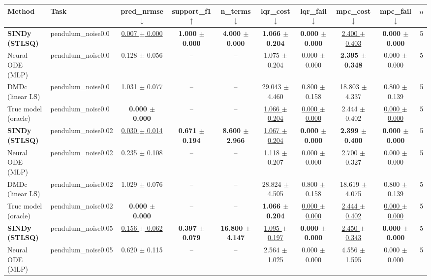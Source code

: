 \begin{tabular}{llcccccccc}
\toprule
Method & Task & pred\_nrmse $\downarrow$ & support\_f1 $\uparrow$ & n\_terms $\downarrow$ & lqr\_cost $\downarrow$ & lqr\_fail $\downarrow$ & mpc\_cost $\downarrow$ & mpc\_fail $\downarrow$ & $n$ \\
\midrule
\textbf{SINDy (STLSQ)} & pendulum\_noise0.0 & \underline{0.007 $\pm$ 0.000} & \textbf{1.000 $\pm$ 0.000} & \textbf{4.000 $\pm$ 0.000} & \textbf{1.066 $\pm$ 0.204} & \textbf{0.000 $\pm$ 0.000} & \underline{2.400 $\pm$ 0.403} & \textbf{0.000 $\pm$ 0.000} & 5 \\
Neural ODE (MLP) & pendulum\_noise0.0 & 0.128 $\pm$ 0.056 & -- & -- & 1.075 $\pm$ 0.204 & 0.000 $\pm$ 0.000 & \textbf{2.395 $\pm$ 0.348} & 0.000 $\pm$ 0.000 & 5 \\
DMDc (linear LS) & pendulum\_noise0.0 & 1.031 $\pm$ 0.077 & -- & -- & 29.043 $\pm$ 4.460 & 0.800 $\pm$ 0.158 & 18.803 $\pm$ 4.337 & 0.800 $\pm$ 0.139 & 5 \\
True model (oracle) & pendulum\_noise0.0 & \textbf{0.000 $\pm$ 0.000} & -- & -- & \underline{1.066 $\pm$ 0.204} & \underline{0.000 $\pm$ 0.000} & 2.444 $\pm$ 0.402 & \underline{0.000 $\pm$ 0.000} & 5 \\
\midrule
\textbf{SINDy (STLSQ)} & pendulum\_noise0.02 & \underline{0.030 $\pm$ 0.014} & \textbf{0.671 $\pm$ 0.194} & \textbf{8.600 $\pm$ 2.966} & \underline{1.067 $\pm$ 0.204} & \textbf{0.000 $\pm$ 0.000} & \textbf{2.399 $\pm$ 0.400} & \textbf{0.000 $\pm$ 0.000} & 5 \\
Neural ODE (MLP) & pendulum\_noise0.02 & 0.235 $\pm$ 0.108 & -- & -- & 1.118 $\pm$ 0.207 & 0.000 $\pm$ 0.000 & 2.700 $\pm$ 0.327 & 0.000 $\pm$ 0.000 & 5 \\
DMDc (linear LS) & pendulum\_noise0.02 & 1.029 $\pm$ 0.076 & -- & -- & 28.824 $\pm$ 4.505 & 0.800 $\pm$ 0.158 & 18.619 $\pm$ 4.075 & 0.800 $\pm$ 0.139 & 5 \\
True model (oracle) & pendulum\_noise0.02 & \textbf{0.000 $\pm$ 0.000} & -- & -- & \textbf{1.066 $\pm$ 0.204} & \underline{0.000 $\pm$ 0.000} & \underline{2.444 $\pm$ 0.402} & \underline{0.000 $\pm$ 0.000} & 5 \\
\midrule
\textbf{SINDy (STLSQ)} & pendulum\_noise0.05 & \underline{0.156 $\pm$ 0.062} & \textbf{0.397 $\pm$ 0.079} & \textbf{16.800 $\pm$ 4.147} & \underline{1.095 $\pm$ 0.197} & \textbf{0.000 $\pm$ 0.000} & \underline{2.450 $\pm$ 0.343} & \textbf{0.000 $\pm$ 0.000} & 5 \\
Neural ODE (MLP) & pendulum\_noise0.05 & 0.620 $\pm$ 0.115 & -- & -- & 2.564 $\pm$ 1.025 & 0.000 $\pm$ 0.000 & 4.556 $\pm$ 1.595 & 0.000 $\pm$ 0.000 & 5 \\

\end{tabular}
